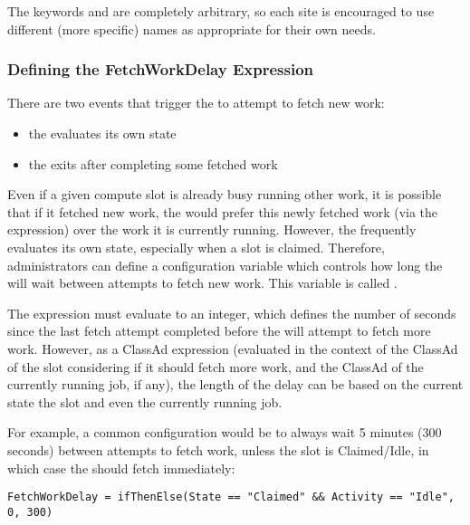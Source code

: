 The keywords  and  are completely arbitrary, so
each site is encouraged to use different (more specific) names as
appropriate for their own needs.


\subsubsection{\label{sec:job-hooks-fetch-work-delay}
Defining the FetchWorkDelay Expression}

There are two events that trigger the  to attempt to
fetch new work:
\begin{itemize}
\item the  evaluates its own state
\item the  exits after completing some fetched work
\end{itemize}

Even if a given compute slot is already busy running other work, it is
possible that if it fetched new work, the  would prefer
this newly fetched work (via the  expression) over the work it
is currently running.
However, the  frequently evaluates its own state,
especially when a slot is claimed.
Therefore, administrators can define a configuration variable which controls
how long the  will wait between attempts to fetch new work.
This variable is called .

The  expression must evaluate to an integer,
which defines the number of seconds since the last fetch attempt
completed before the  will attempt to fetch more work.
However, as a ClassAd expression (evaluated in the context of the
ClassAd of the slot considering if it should fetch more work, and the
ClassAd of the currently running job, if any), the length of the delay
can be based on the current state the slot and even the currently
running job.

For example, a common configuration would be to always wait 5
minutes (300 seconds) between attempts to fetch work, unless the slot
is Claimed/Idle, in which case the  should fetch
immediately:

\footnotesize
\begin{verbatim}
FetchWorkDelay = ifThenElse(State == "Claimed" && Activity == "Idle", 0, 300) 
\end{verbatim}
\normalsize

